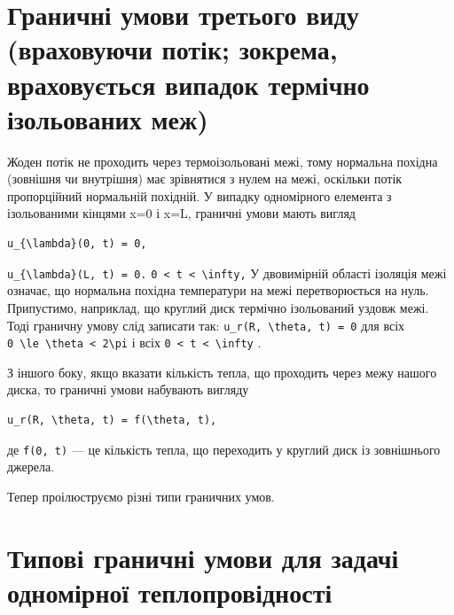\documentclass[
  ukrainian,
]{article}
\begin{document}
\section{Граничні умови третього виду (враховуючи потік; зокрема,
враховується випадок термічно ізольованих
меж)}\label{ux433ux440ux430ux43dux438ux447ux43dux456-ux443ux43cux43eux432ux438-ux442ux440ux435ux442ux44cux43eux433ux43e-ux432ux438ux434ux443-ux432ux440ux430ux445ux43eux432ux443ux44eux447ux438-ux43fux43eux442ux456ux43a-ux437ux43eux43aux440ux435ux43cux430-ux432ux440ux430ux445ux43eux432ux443ux454ux442ux44cux441ux44f-ux432ux438ux43fux430ux434ux43eux43a-ux442ux435ux440ux43cux456ux447ux43dux43e-ux456ux437ux43eux43bux44cux43eux432ux430ux43dux438ux445-ux43cux435ux436}

Жоден потік не проходить через термоізольовані межі, тому нормальна
похідна (зовнішня чи внутрішня) має зрівнятися з нулем на межі, оскільки
потік пропорційний нормальній похідній. У випадку одномірного елемента з
ізольованими кінцями x=0 і x=L, граничні умови мають вигляд

\begin{verbatim}
u_{\lambda}(0, t) = 0,
\end{verbatim}

\texttt{u\_\{\textbackslash{}lambda\}(L,\ t)\ =\ 0.}
\texttt{0\ \textless{}\ t\ \textless{}\ \textbackslash{}infty,} У
двовимірній області ізоляція межі означає, що нормальна похідна
температури на межі перетворюється на нуль. Припустимо, наприклад, що
круглий диск термічно ізольований уздовж межі. Тоді граничну умову слід
записати так: \texttt{u\_r(R,\ \textbackslash{}theta,\ t)\ =\ 0} для
всіх
\texttt{0\ \textbackslash{}le\ \textbackslash{}theta\ \textless{}\ 2\textbackslash{}pi}
і всіх \texttt{0\ \textless{}\ t\ \textless{}\ \textbackslash{}infty} .

З іншого боку, якщо вказати кількість тепла, що проходить через межу
нашого диска, то граничні умови набувають вигляду

\begin{verbatim}
u_r(R, \theta, t) = f(\theta, t),
\end{verbatim}

де \texttt{f(0,\ t)} --- це кількість тепла, що переходить у круглий
диск із зовнішнього джерела.

Тепер проілюструємо різні типи граничних умов.

\section{Типові граничні умови для задачі одномірної
теплопровідності}\label{ux442ux438ux43fux43eux432ux456-ux433ux440ux430ux43dux438ux447ux43dux456-ux443ux43cux43eux432ux438-ux434ux43bux44f-ux437ux430ux434ux430ux447ux456-ux43eux434ux43dux43eux43cux456ux440ux43dux43eux457-ux442ux435ux43fux43bux43eux43fux440ux43eux432ux456ux434ux43dux43eux441ux442ux456}
\end{document}
